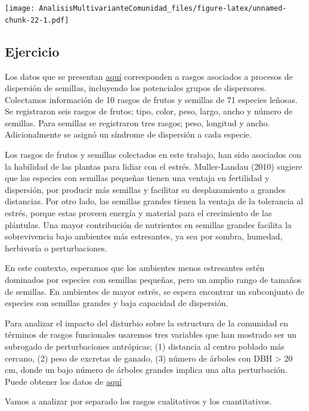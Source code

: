 \documentclass[]{book}
\begin{document}
\texttt{[image: AnalisisMultivarianteComunidad\_files/figure-latex/unnamed-chunk-22-1.pdf]}

\subsection{Ejercicio}\label{ejercicio}

Los datos que se presentan
\href{\%22https://github.com/Ciespinosa/AnalisisMultivariante/blob/gh-pages/TraitsVege.csv\%22}{aquí}
corresponden a rasgos asociados a procesos de dispersión de semillas,
incluyendo los potenciales grupos de dispersores. Colectamos información
de 10 rasgos de frutos y semillas de 71 especies leñosas. Se registraron
seis rasgos de frutos; tipo, color, peso, largo, ancho y número de
semillas. Para semillas se registraron tres rasgos; peso, longitud y
ancho. Adicionalmente se asignó un síndrome de dispersión a cada
especie.

Los rasgos de frutos y semillas colectados en este trabajo, han sido
asociados con la habilidad de las plantas para lidiar con el estrés.
Muller-Landau (2010) sugiere que las especies con semillas pequeñas
tienen una ventaja en fertilidad y dispersión, por producir más semillas
y facilitar su desplazamiento a grandes distancias. Por otro lado, las
semillas grandes tienen la ventaja de la tolerancia al estrés, porque
estas proveen energía y material para el crecimiento de las plántulas.
Una mayor contribución de nutrientes en semillas grandes facilita la
sobrevivencia bajo ambientes más estresantes, ya sea por sombra,
humedad, herbivoría o perturbaciones.

En este contexto, esperamos que los ambientes menos estresantes estén
dominados por especies con semillas pequeñas, pero un amplio rango de
tamaños de semillas. En ambientes de mayor estrés, se espera encontrar
un subconjunto de especies con semillas grandes y baja capacidad de
dispersión.

Para analizar el impacto del disturbio sobre la estructura de la
comunidad en términos de rasgos funcionales usaremos tres variables que
han mostrado ser un subrogado de perturbaciones antrópicas; (1)
distancia al centro poblado más cercano, (2) peso de excretas de ganado,
(3) número de árboles con DBH \textgreater{} 20 cm, donde un bajo número
de árboles grandes implica una alta perturbación. Puede obtener los
datos de
\href{\%22https://github.com/Ciespinosa/AnalisisMultivariante/blob/gh-pages/Parcelas.csv\%22}{aquí}

Vamos a analizar por separado los rasgos cualitativos y los
cuantitativos.
\end{document}
